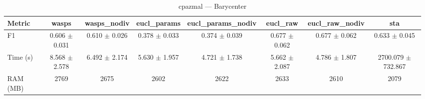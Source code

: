 \begin{table}[htbp]
\centering
\begin{NiceTabular}{lccccccc}
\toprule
Metric & wasps & wasps\_nodiv & eucl\_params & eucl\_params\_nodiv & eucl\_raw & eucl\_raw\_nodiv & sta \\
\midrule
F1 & 0.606 $\pm$ 0.031 & 0.610 $\pm$ 0.026 & 0.378 $\pm$ 0.033 & 0.374 $\pm$ 0.039 & 0.677 $\pm$ 0.062 & 0.677 $\pm$ 0.062 & 0.633 $\pm$ 0.045 \\
Time (s) & 8.568 $\pm$ 2.578 & 6.492 $\pm$ 2.174 & 5.630 $\pm$ 1.957 & 4.721 $\pm$ 1.738 & 5.662 $\pm$ 2.087 & 4.786 $\pm$ 1.807 & 2700.079 $\pm$ 732.867 \\
RAM (MB) & 2769 & 2675 & 2602 & 2622 & 2633 & 2610 & 2079 \\
\bottomrule
\end{NiceTabular}
\caption{cpazmal --- Barycenter}
\label{tab:exp1bis_cpazmal_barycenter}
\end{table}
